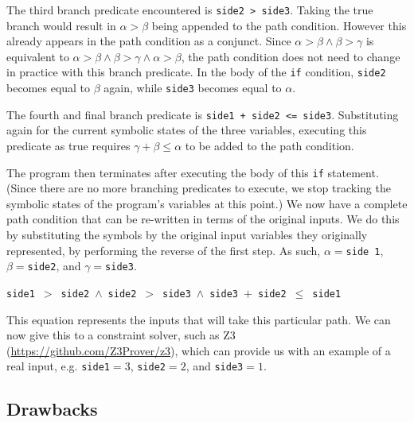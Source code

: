 
The third branch predicate encountered is {\tt side2 > side3}. Taking the true
branch would result in $\alpha > \beta$ being appended to the path condition.
However this already appears in the path condition as a conjunct. Since $\alpha
> \beta \wedge \beta > \gamma$ is equivalent to $\alpha > \beta \wedge \beta >
\gamma \wedge \alpha > \beta$, the path condition does not need to change in
practice with this branch predicate.
%
In the body of the {\tt if} condition, {\tt side2} becomes equal to $\beta$
again, while {\tt side3} becomes equal to $\alpha$.


The fourth and final branch predicate is {\tt side1 + side2 <= side3}.
Substituting again for the current symbolic states of the three variables, 
executing this predicate as true requires $\gamma + \beta \leq \alpha$ to be
added to the path condition. 

The program then terminates after executing the body of this {\tt if} statement.
(Since there are no more branching predicates to execute, we stop tracking the
symbolic states of the program's variables at this point.) We now have a
complete path condition that can be re-written in terms of the original inputs.
We do this by substituting the symbols by the original input variables they
originally represented, by performing the reverse of the first step. As
such, $\alpha = ${\tt side 1}, $\beta = ${\tt side2}, and $\gamma = ${\tt side3}.


\begin{center}
{\tt side1}~$ > $~{\tt side2}~$ \wedge $~{\tt side2}~$ > $~{\tt side3}~$ \wedge
$~{\tt side3}~$ + $~{\tt side2}~$ \leq $~{\tt side1}
\end{center}

This equation represents the inputs that will take this particular path. We can
now give this to a constraint solver, such as Z3
(\url{https://github.com/Z3Prover/z3}), which can provide us with an example of
a real input, e.g. {\tt side1}$ = 3$, {\tt side2}$ = 2$, and {\tt side3}$ = 1$. 

\subsection{Drawbacks}

